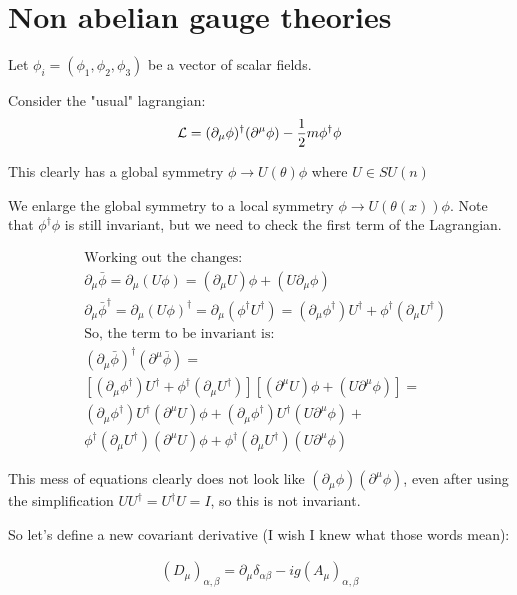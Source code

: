 \chapter{Non abelian gauge theories}

Let $\phi_i = (\phi_1, \phi_2, \phi_3)$ be a vector of scalar fields.

Consider the "usual" lagrangian:
$$\mathcal{L} = (\partial_\mu \phi)^\dagger (\partial^\mu \phi) - \frac{1}{2}m \phi^\dagger \phi$$

This clearly has a global symmetry $\phi \to U(\theta) \phi$ where $U \in SU(n)$

We enlarge the global symmetry to a local symmetry $\phi \to U(\theta(x)) \phi$.
Note that $\phi^\dagger \phi$ is still invariant, but we need to check
the first term of the Lagrangian.

\begin{align*}
    &\text{Working out the changes:} \\
    &\partial_\mu \bar \phi = \partial_\mu (U \phi) = (\partial_\mu U) \phi + (U \partial_\mu \phi) \\
    &\partial_\mu {\bar \phi}^\dagger = \partial_\mu (U \phi)^\dagger =  \partial_\mu (\phi^\dagger U^\dagger) = 
    (\partial_\mu \phi^\dagger) U^\dagger + \phi^\dagger (\partial_\mu U^\dagger)
    \\
    &\text{So, the term to be invariant is:} \\
    &(\partial_\mu \bar \phi)^\dagger (\partial^\mu \bar \phi) =  \\
    &[(\partial_\mu \phi^\dagger) U^\dagger + \phi^\dagger (\partial_\mu U^\dagger)][(\partial^\mu U) \phi + (U \partial^\mu \phi) ] =  \\
    &(\partial_\mu \phi^\dagger) U^\dagger    (\partial^\mu U) \phi + 
    (\partial_\mu \phi^\dagger) U^\dagger    (U \partial^\mu \phi) + \\
    &\phi^\dagger (\partial_\mu U^\dagger)    (\partial^\mu U) \phi + 
    \phi^\dagger (\partial_\mu U^\dagger)     (U \partial^\mu \phi) 
\end{align*}

This mess of equations clearly does not look like
$(\partial_\mu \phi) (\partial^\mu \phi)$,
even after using the simplification $U U^\dagger = U^\dagger U = I$,
so this is not invariant.

So let's define a new covariant derivative (I wish I knew what those words mean):

\begin{align*}
    (D_\mu)_{\alpha, \beta} = \partial_\mu \delta_{\alpha \beta} - i g (A_\mu)_{\alpha, \beta}
\end{align*}

